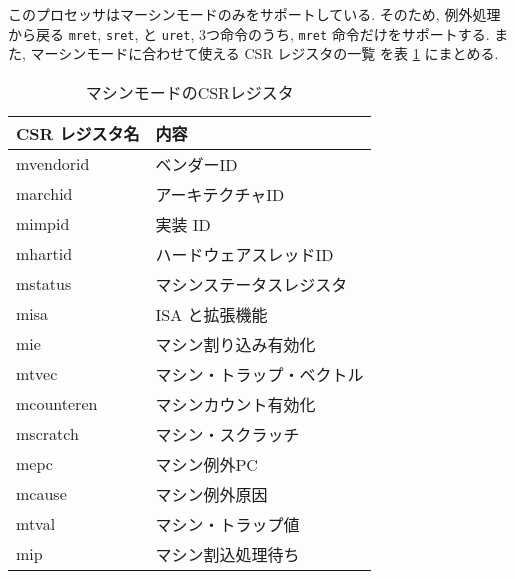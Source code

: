 \documentclass[../specifications.tex]{subfiles}
\begin{document}
  このプロセッサはマーシンモードのみをサポートしている.
  そのため, 例外処理から戻る \verb|mret|, \verb|sret|, と \verb|uret|, 
  3つ命令のうち, \verb|mret| 命令だけをサポートする.
  また, マーシンモードに合わせて使える CSR レジスタの一覧
  \cite{riscv-reader} \cite{riscv-priviledged}
  を表 \ref{table:csrs} にまとめる.

  \begin{table}[h]
    \begin{tabular}{|l|l|}
    \hline
    CSR レジスタ名 & 内容 \\ \hline
    mvendorid & ベンダーID \\
    marchid & アーキテクチャID \\
    mimpid & 実装 ID \\
    mhartid & ハードウェアスレッドID \\
    mstatus & マシンステータスレジスタ \\
    misa & ISA と拡張機能 \\
    mie & マシン割り込み有効化 \\
    mtvec & マシン・トラップ・ベクトル \\
    mcounteren & マシンカウント有効化 \\
    mscratch & マシン・スクラッチ \\
    mepc & マシン例外PC \\
    mcause & マシン例外原因 \\
    mtval & マシン・トラップ値 \\
    mip & マシン割込処理待ち \\ \hline
    \end{tabular}
    \caption{マシンモードのCSRレジスタ}
    \label{table:csrs}
  \end{table}
  
\end{document}
